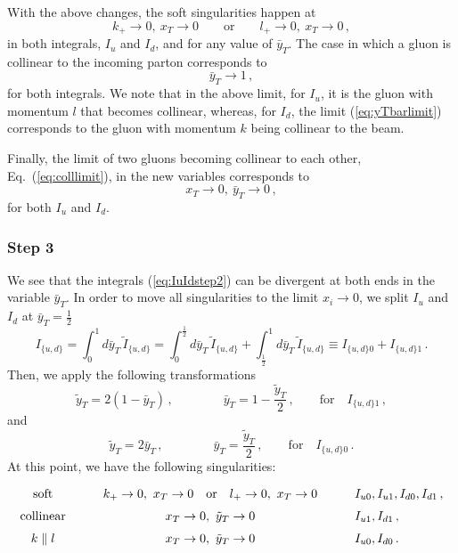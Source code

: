 \documentclass[a4paper,11pt]{article}
\numberwithin{equation}{section}
\begin{document}
%
With the above changes, the soft singularities happen at
%
\begin{equation}
  k_+ \to 0,\ x_T \to 0
  \qquad \text{or} \qquad
  l_+ \to 0,\ x_T \to 0\,,
\end{equation}
in both integrals, $I_u$ and $I_d$, and for any value of $\bar y_T$. 
%
The case in which a gluon is collinear to the incoming parton corresponds to
%
\begin{equation}
  \bar y_T \to 1\,,
  \label{eq:yTbarlimit}
\end{equation}
for both integrals. We note that in the above limit, for $I_u$, it is the gluon
with momentum $l$ that becomes collinear, whereas, for $I_d$, the limit
(\ref{eq:yTbarlimit})  corresponds to the gluon with momentum $k$ being
collinear to the beam.

Finally, the limit of two gluons becoming collinear to each other,
Eq.~(\ref{eq:colllimit}), in the new variables corresponds to 
\begin{equation}
  x_T \to 0,\ \bar y_T \to 0\,,
\end{equation}
%
for both $I_u$ and $I_d$.


\subsubsection*{Step 3}

We see that  the integrals (\ref{eq:IuIdstep2}) can be divergent at both ends in
the variable $\bar y_T$.
%
In order to move all singularities to the limit $x_i \to 0$, we split $I_u$ and
$I_d$ at $\bar y_T = \frac12$
%
\begin{equation}
 I_{\{u,d\}} = \int_0^1 d \bar y_T\, \tilde I_{\{u,d\}} =
 \int_0^\frac12 d \bar y_T\, \tilde I_{\{u,d\}} +
 \int_\frac12^1 d \bar y_T\, \tilde I_{\{u,d\}} \equiv 
 I_{\{u,d\}0} + I_{\{u,d\}1}\,.
\end{equation}
%
Then, we apply the following transformations
%
\begin{equation}
  \tilde y_T = 2(1-\bar y_T)\,,
  \qquad \qquad
  \bar y_T = 1-\frac{\tilde y_T}{2}\,,
  \qquad 
  \text{for}\quad I_{\{u,d\}1}\,,
\end{equation}
%
and
%
\begin{equation}
  \tilde y_T = 2 \bar y_T\,,
  \qquad \qquad
  \bar y_T = \frac{\tilde y_T}{2}\,,
  \qquad 
  \text{for}\quad I_{\{u, d\}0}\,.
\end{equation}
%
At this point, we have the following singularities:
%
\begin{equation}
  {\renewcommand{\arraystretch}{1.5}%
  \begin{array}{c@{\qquad \quad}c@{\qquad \quad}l}
   \text{soft}     &  
   k_+ \to 0,\  x_T \to 0 \quad \text{or} \quad l_+ \to 0,\  x_T \to 0 &
   I_{u0}, I_{u1}, I_{d0}, I_{d1}\,,              \\
   \text{collinear} & 
   x_T \to 0,\ \tilde y_T \to 0 & 
   I_{u1}, I_{d1}\,, \\
   k \parallel l & 
   x_T \to 0,\ \tilde y_T \to 0 & 
   I_{u0}, I_{d0}\,. 
  \end{array}
  }
\end{equation}
\end{document}
